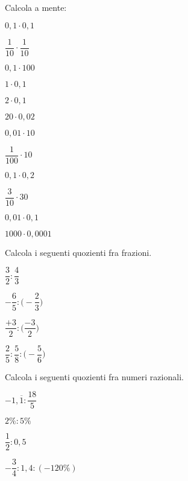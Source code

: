 \begin{esercizio}
Calcola a mente:
 \label{ese:3.51}
\begin{multicols}{4}
 \begin{enumeratea}
 \spazielenx
\item $0,1\cdot 0,1$
\item $\dfrac{1}{10}\cdot\dfrac{1}{10}$
\item $0,1\cdot 100$
\item $1\cdot 0,1$
\item $2\cdot 0,1$
\item $20\cdot 0,02$
\item $0,01\cdot 10$
\item $\dfrac{1}{100}\cdot 10$
\item $0,1\cdot 0,2$
\item $\dfrac{3}{10}\cdot 30$
\item $0,01\cdot 0,1$
\item $1000\cdot 0,0001$
 \end{enumeratea}
\end{multicols}
\end{esercizio}


\begin{esercizio}
 \label{ese:3.52}
Calcola i seguenti quozienti fra frazioni.
\begin{multicols}{4}
\begin{enumeratea}
\item $\dfrac{3}{2}:\dfrac{4}{3}$
\item $-\dfrac{6}{5}:\bigg(-\dfrac{2}{3}\bigg)$
\item $\dfrac{+3}{2}:\bigg(\dfrac{-3}{2}\bigg)$
\item $\dfrac{2}{5}:\dfrac{5}{8}:\bigg(-\dfrac{5}{6}\bigg)$
\end{enumeratea}
\end{multicols}
\end{esercizio}

\begin{esercizio}
 \label{ese:3.53}
Calcola i seguenti quozienti fra numeri razionali.
\begin{multicols}{2}
\begin{enumeratea}
\spazielenx
\item $-1,\overline{1}:\dfrac{18}{5}$
\item $2\%:5\%$
\item $\dfrac{1}{2}:0,5$
\item $-\dfrac{3}{4}:1,4:(-120\%)$
\end{enumeratea}
\end{multicols}
\end{esercizio}

